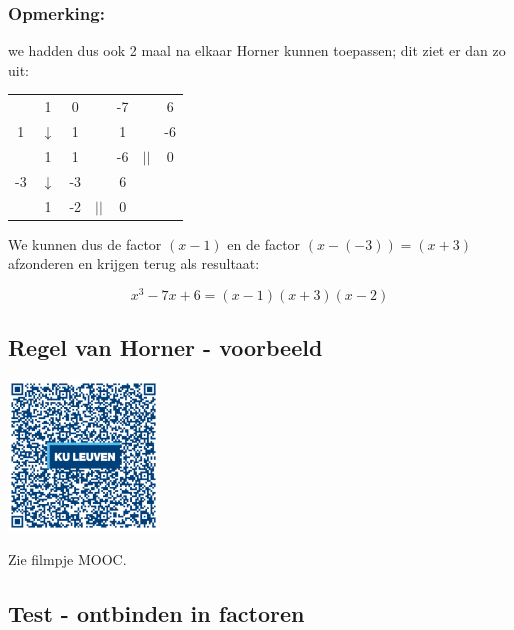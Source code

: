 \begin{voorbeeld}
\subsubsection{Opmerking:} we hadden dus ook 2 maal na elkaar Horner kunnen toepassen; dit ziet er dan zo uit:


\begin{center}
	\begin{tabular}{c|cccccc}
		& 1 & 0 & &-7 & & 6 \\
		1 & $\downarrow$ & 1 & & 1 & & -6\\
		\hline 
		& 1 & 1 & & -6 & $||$ & 0 \\
		-3 & $\downarrow$ & -3 & & 6 & &\\
		\hline
		& 1 & -2 & $||$ & 0 &
	\end{tabular}
\end{center}


We kunnen dus de factor $(x-1)$ en de factor $(x-(-3))=(x+3)$ afzonderen en krijgen terug als resultaat:

\begin{equation*}
x^3-7x+6=(x-1)(x+3)(x-2)
\end{equation*}
\end{voorbeeld}

\subsection{Regel van Horner - voorbeeld}
\begin{minipage}{.25\linewidth}
	\raggedright
	\includegraphics[width=4cm]{1_elem_rekenvaardigheden_A/inputs/QR_Code_HORNER_module1new}
\end{minipage}
\begin{minipage}{.7\linewidth}
	Zie filmpje MOOC.
\end{minipage}

\subsection{Test - ontbinden in factoren}
